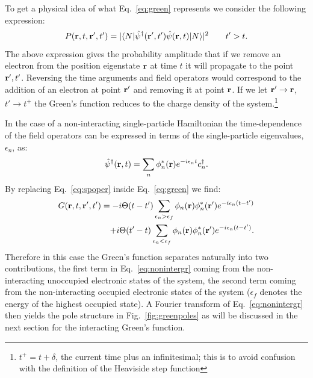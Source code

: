 %
To get a physical idea of what Eq.~\ref{eq:green} represents we consider the following expression:
\begin{equation}
P({\bf r},t,{\bf r^\prime},t') = |\langle N|\hat{\psi}^{\dagger}({\bf r}',t')\hat{\psi}({\bf r},t)|N\rangle|^{2} \qquad t'>t.
\end{equation}
%
The above expression gives the probability amplitude that if we remove an electron from the 
position eigenstate ${\bf r}$ at time $t$ it will propagate to the point ${\bf r}',t'$. Reversing the time
arguments and field operators would correspond to the addition of an electron at point ${\bf r}'$ and 
removing it at point ${\bf r}$.
%
If we let ${\bf r}' \rightarrow {\bf r}$, $t' \rightarrow t^{+}$ 
the Green's function reduces to the charge density of the system.\footnote{$t^{+} = t + \delta$, the 
current time plus an infinitesimal; this is to avoid confusion 
with the definition of the Heaviside step function}

In the case of a non-interacting single-particle Hamiltonian 
the time-dependence of the field operators can be expressed in terms of the 
single-particle eigenvalues, $\epsilon_{n}$, as:
%
\begin{equation}
\label{eq:spoper}
\hat{\psi}^{\dagger}({\bf r},t) = \sum_{n} \phi^{*}_{n}({\bf r})e^{-i\epsilon_{n}t} c^{\dagger}_{n}.
\end{equation}
%
By replacing Eq.~\ref{eq:spoper} inside Eq.~\ref{eq:green} we find:
%
\begin{align}
\label{eq:nonintergr}
G({\bf r},t,{\bf r^\prime}, t') = -i\Theta(t-t')\sum_{\epsilon_n>\epsilon_{f}}\phi_{n}({\bf r})\phi^{*}_{n}({\bf r^\prime})e^{-i\epsilon_{n}(t-t')} \nonumber \\
	        			  +i\Theta(t'-t)\sum_{\epsilon_n<\epsilon_{f}}\phi_{n}({\bf r})\phi^{*}_{n}({\bf r^\prime})e^{-i\epsilon_{n}(t-t')}.
\end{align}
%
Therefore in this case the Green's function separates naturally into 
two contributions, the first term in Eq.~\ref{eq:nonintergr} coming
from the non-interacting unoccupied electronic states of the system, the second term 
coming from the non-interacting occupied electronic states of the system ($\epsilon_{f}$
denotes the energy of the highest occupied state). A Fourier 
transform of Eq.~\ref{eq:nonintergr} then yields the pole structure in 
Fig.~\ref{fig:greenpoles} as will be discussed in the next 
section for the interacting Green's function.


